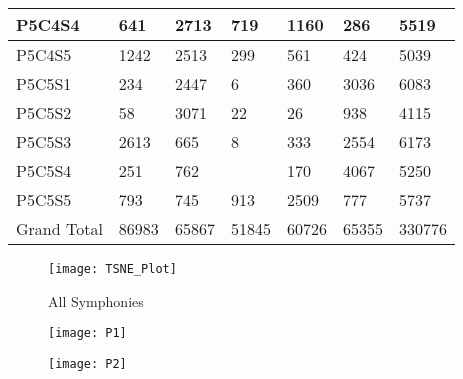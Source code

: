 \begin{longtable}{lllllll}
\multicolumn{1}{|l|}{P5C4S4} & \multicolumn{1}{l|}{641} & \multicolumn{1}{l|}{2713} & \multicolumn{1}{l|}{719} & \multicolumn{1}{l|}{1160} & \multicolumn{1}{l|}{286} & \multicolumn{1}{l|}{5519} \\ \hline
\multicolumn{1}{|l|}{P5C4S5} & \multicolumn{1}{l|}{1242} & \multicolumn{1}{l|}{2513} & \multicolumn{1}{l|}{299} & \multicolumn{1}{l|}{561} & \multicolumn{1}{l|}{424} & \multicolumn{1}{l|}{5039} \\ \hline
\multicolumn{1}{|l|}{P5C5S1} & \multicolumn{1}{l|}{234} & \multicolumn{1}{l|}{2447} & \multicolumn{1}{l|}{6} & \multicolumn{1}{l|}{360} & \multicolumn{1}{l|}{3036} & \multicolumn{1}{l|}{6083} \\ \hline
\multicolumn{1}{|l|}{P5C5S2} & \multicolumn{1}{l|}{58} & \multicolumn{1}{l|}{3071} & \multicolumn{1}{l|}{22} & \multicolumn{1}{l|}{26} & \multicolumn{1}{l|}{938} & \multicolumn{1}{l|}{4115} \\ \hline
\multicolumn{1}{|l|}{P5C5S3} & \multicolumn{1}{l|}{2613} & \multicolumn{1}{l|}{665} & \multicolumn{1}{l|}{8} & \multicolumn{1}{l|}{333} & \multicolumn{1}{l|}{2554} & \multicolumn{1}{l|}{6173} \\ \hline
\multicolumn{1}{|l|}{P5C5S4} & \multicolumn{1}{l|}{251} & \multicolumn{1}{l|}{762} & \multicolumn{1}{l|}{} & \multicolumn{1}{l|}{170} & \multicolumn{1}{l|}{4067} & \multicolumn{1}{l|}{5250} \\ \hline
\multicolumn{1}{|l|}{P5C5S5} & \multicolumn{1}{l|}{793} & \multicolumn{1}{l|}{745} & \multicolumn{1}{l|}{913} & \multicolumn{1}{l|}{2509} & \multicolumn{1}{l|}{777} & \multicolumn{1}{l|}{5737} \\ \hline
Grand Total & 86983 & 65867 & 51845 & 60726 & 65355 & 330776 \\ \hline
\end{longtable}


\begin{figure}[h]
\caption{All Symphonies}
\centering
\texttt{[image: TSNE\_Plot]}
\end{figure}

\begin{figure}
\centering
\begin{minipage}{.5\textwidth}
  \centering
  \texttt{[image: P1]}
  \label{fig:test1}
\end{minipage}%
\begin{minipage}{.5\textwidth}
  \centering
  \texttt{[image: P2]}
  \label{fig:test2}
\end{minipage}
\end{figure}

